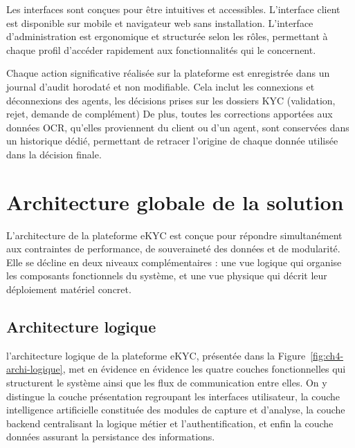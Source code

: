 \begin{description}[style=nextline, leftmargin=0pt, labelwidth=!, font=\bfseries\color{black}]
  \item[Accessibilité]
  Les interfaces sont conçues pour être intuitives et accessibles. L'interface client est disponible sur mobile et navigateur web sans installation. L'interface d'administration est ergonomique et structurée selon les rôles, permettant à chaque profil d'accéder rapidement aux fonctionnalités qui le concernent.

  \item[Auditabilité]
  Chaque action significative réalisée sur la plateforme est enregistrée dans un journal d'audit horodaté et non modifiable. Cela inclut les connexions et déconnexions des agents, les décisions prises sur les dossiers KYC (validation, rejet, demande de complément) De plus, toutes les corrections apportées aux données OCR, qu'elles proviennent du client ou d'un agent, sont conservées dans un historique dédié, permettant de retracer l'origine de chaque donnée utilisée dans la décision finale.

\end{description}


\section{Architecture globale de la solution}
\label{sec:architecture-globale}

L'architecture de la plateforme eKYC est conçue pour répondre simultanément aux contraintes de performance, de souveraineté des données et de modularité. Elle se décline en deux niveaux complémentaires : une vue logique qui organise les composants fonctionnels du système, et une vue physique qui décrit leur déploiement matériel concret.

\subsection{Architecture logique}
\label{subsec:architecture-logique}

 l'architecture logique de la plateforme eKYC, présentée dans la Figure~\ref{fig:ch4-archi-logique}, met en évidence en évidence les quatre couches fonctionnelles qui structurent le système ainsi que les flux de communication entre elles. On y distingue la couche présentation regroupant les interfaces utilisateur, la couche intelligence artificielle constituée des modules de capture et d'analyse, la couche backend centralisant la logique métier et l'authentification, et enfin la couche données assurant la persistance des informations.

